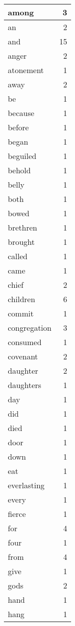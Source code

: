 \begin{center}
\begin{longtable}{l|r}
among & 3\\ \hline 
an & 2\\ \hline 
and & 15\\ \hline 
anger & 2\\ \hline 
atonement & 1\\ \hline 
away & 2\\ \hline 
be & 1\\ \hline 
because & 1\\ \hline 
before & 1\\ \hline 
began & 1\\ \hline 
beguiled & 1\\ \hline 
behold & 1\\ \hline 
belly & 1\\ \hline 
both & 1\\ \hline 
bowed & 1\\ \hline 
brethren & 1\\ \hline 
brought & 1\\ \hline 
called & 1\\ \hline 
came & 1\\ \hline 
chief & 2\\ \hline 
children & 6\\ \hline 
commit & 1\\ \hline 
congregation & 3\\ \hline 
consumed & 1\\ \hline 
covenant & 2\\ \hline 
daughter & 2\\ \hline 
daughters & 1\\ \hline 
day & 1\\ \hline 
did & 1\\ \hline 
died & 1\\ \hline 
door & 1\\ \hline 
down & 1\\ \hline 
eat & 1\\ \hline 
everlasting & 1\\ \hline 
every & 1\\ \hline 
fierce & 1\\ \hline 
for & 4\\ \hline 
four & 1\\ \hline 
from & 4\\ \hline 
give & 1\\ \hline 
gods & 2\\ \hline 
hand & 1\\ \hline 
hang & 1\\ \hline 

\end{longtable}
\end{center}
